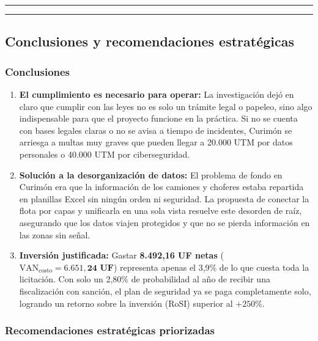 \begin{center}\rule{0.5\linewidth}{0.5pt}\end{center}

\begin{center}\rule{0.5\linewidth}{0.5pt}\end{center}

\subsection{Conclusiones y recomendaciones estratégicas}\label{conclusiones-y-recomendaciones-estratuxe9gicas}

\subsubsection{Conclusiones}\label{conclusiones}

\begin{enumerate}
\def\labelenumi{\arabic{enumi}.}
\tightlist
\item
  \textbf{El cumplimiento es necesario para operar:} La investigación dejó en claro que cumplir con las leyes no es solo un trámite legal o papeleo, sino algo indispensable para que el proyecto funcione en la práctica. Si no se cuenta con bases legales claras o no se avisa a tiempo de incidentes, Curimón se arriesga a multas muy graves que pueden llegar a 20.000 UTM por datos personales o 40.000 UTM por ciberseguridad.
\item
  \textbf{Solución a la desorganización de datos:} El problema de fondo en Curimón era que la información de los camiones y choferes estaba repartida en planillas Excel sin ningún orden ni seguridad. La propuesta de conectar la flota por capas y unificarla en una sola vista resuelve este desorden de raíz, asegurando que los datos viajen protegidos y que no se pierda información en las zonas sin señal.
\item
  \textbf{Inversión justificada:} Gastar \textbf{8.492,16 UF netas} (\(\text{VAN}_{\text{costo}} = \mathbf{6.651,24\text{ UF}}\)) representa apenas el 3,9\% de lo que cuesta toda la licitación. Con solo un 2,80\% de probabilidad al año de recibir una fiscalización con sanción, el plan de seguridad ya se paga completamente solo, logrando un retorno sobre la inversión (RoSI) superior al \(+250\%\).
\end{enumerate}

\subsubsection{Recomendaciones estratégicas priorizadas}\label{recomendaciones-estratuxe9gicas-priorizadas}

